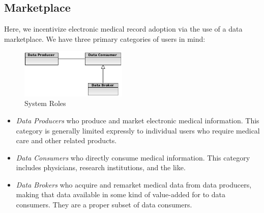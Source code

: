 \documentclass[10pt, conference, compsocconf]{IEEEtran}
\begin{document}
\subsection*{Marketplace} 
Here, we incentivize electronic medical record adoption via the use of a data marketplace.  We have three primary categories of users in mind:

\begin{figure}[!t]
\centering
\includegraphics[width=2in]{roles}
\caption{System Roles}
\label{System Roles}
\end{figure}

\begin{itemize}
\item \textit{Data Producers} who produce and market electronic medical information.  This category is generally limited expressly to individual users who require medical care and other related products.
\item \textit{Data Consumers} who directly consume medical information.  This category includes physicians, research institutions, and the like.
\item \textit{Data Brokers} who acquire and remarket medical data from data producers, making that data available in some kind of value-added for to data consumers.  They are a proper subset of data consumers.
\end{itemize}
\end{document}
